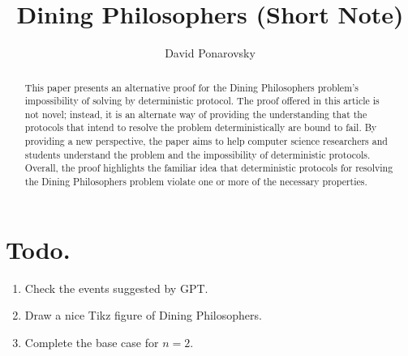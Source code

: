 \documentclass[manuscript,screen,review]{acmart}
\begin{document}


\title{Dining Philosophers (Short Note)} 
\author{David Ponarovsky}

\ifdefined\ACM
\else
  \maketitle
\fi

\begin{abstract} 
This paper presents an alternative proof for the Dining Philosophers problem's impossibility of solving by deterministic protocol. The proof offered in this article is not novel; instead, it is an alternate way of providing the understanding that the protocols that intend to resolve the problem deterministically are bound to fail. By providing a new perspective, the paper aims to help computer science researchers and students understand the problem and the impossibility of deterministic protocols. Overall, the proof highlights the familiar idea that deterministic protocols for resolving the Dining Philosophers problem violate one or more of the necessary properties.
\end{abstract}

%
\ifdefined\ACM
  \maketitle
\fi

% 
%


\newcommand{\Oh}{{\mathcal{O}}}
\newcommand{\bitsize}{N}
\newcommand{\longversion}[1]{#1}
\newcommand{\abpartization}{{\sc Vertex $(r,\ell)$-Partization}}


\section{Todo.}
\begin{enumerate}
  \item Check the events suggested by GPT.  
  \item Draw a nice Tikz figure of Dining Philosophers.   
  \item Complete the base case for $n=2$.  
\end{enumerate}
\end{document}
